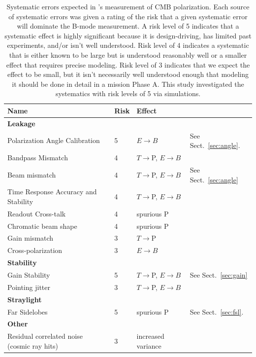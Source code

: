 \documentclass[PICOReport.tex]{subfiles}
\begin{document}
\begin{table}[h!]
\hspace{-0.1in}
\parbox{3.4in}{
\centering
\scriptsize
 \begin{tabular}{p{3.3cm} p{0.5cm} p{1.4cm} p{1.7cm}}
 \hline
\textbf{Name} & \textbf{Risk}&\textbf{Effect} \\
 \hline
\textbf{Leakage}& &\\
Polarization Angle Calibration\dotfill& 
5&
$E{\to}B$ &
See Sect.~\ref{sec:angle}.
\\
 Bandpass Mismatch\dotfill&
 4& 
$T{\to}$P, $E{\to}B$  
   \\
Beam mismatch\dotfill& 
4&
$T{\to}$P, $E{\to}B$
& See Sect.~\ref{sec:angle}
\\
Time Response Accuracy and Stability\dotfill&
4&
$T{\to}$P, $E{\to}B$
\\
Readout Cross-talk\dotfill& 
4&
spurious P
\\
Chromatic beam shape\dotfill&
4&
spurious P
\\

Gain mismatch\dotfill&
3&
$T{\to}$P   
\\


Cross-polarization\dotfill&
3&
$E{\to}B$
\\
\hline 
\textbf{Stability} & & \\
Gain Stability\dotfill& 
5&
$T{\to}$P, $E{\to} B$
& 
See Sect.~\ref{sec:gain}
\\
Pointing jitter\dotfill&
3&
$T{\to}$P, $E{\to}B$
\\

\hline
\textbf{Straylight}& & \\
Far Sidelobes\dotfill& 
5&
spurious P
&
See Sect.~\ref{sec:fsl}.\\
 \hline
\textbf{Other} \\
Residual correlated noise (cosmic ray hits)\dotfill&
3 &
increased variance
\\
\hline
 \end{tabular}
}
\hspace{-0.0in}
\parbox{3.1in}{
\caption{\label{tbl:SystematicsList2col} Systematic errors expected in \pico's measurement of CMB polarization. Each source of systematic errors was given a rating of the risk that a given systematic error will dominate the B-mode measurement.  A risk level of 5 indicates that a systematic effect is highly significant because it is design-driving, has limited past experiments, and/or isn't well understood.  Risk level of 4 indicates a systematic that is either known to be large but is understood reasonably well or a smaller effect that requires precise modeling.  Risk level of 3 indicates that we expect the effect to be small, but it isn't necessarily well understood enough that modeling it should be done in detail in a mission Phase A. This study investigated the systematics with risk levels of 5 via simulations.}}
\hspace{-0.0in}
\end{table}
\end{document}
